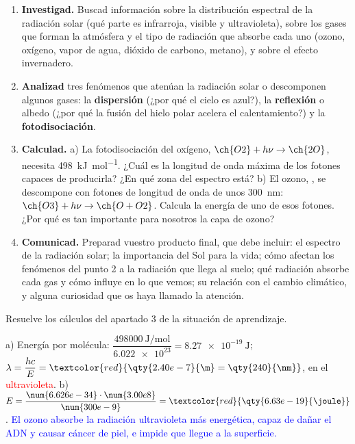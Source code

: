 \begin{enumerate}[label=\numberballred]
    \item \textbf{Investigad.} Buscad información sobre la distribución espectral de la radiación solar (qué parte es infrarroja,
    visible y ultravioleta), sobre los gases que forman la atmósfera y el tipo de radiación que absorbe cada uno (ozono, oxígeno,
    vapor de agua, dióxido de carbono, metano), y sobre el efecto invernadero.
    \item \textbf{Analizad} tres fenómenos que atenúan la radiación solar o descomponen algunos gases: la \textbf{dispersión}
    (¿por qué el cielo es azul?), la \textbf{reflexión} o albedo (¿por qué la fusión del hielo polar acelera el calentamiento?) y
    la \textbf{fotodisociación}.
    \item \textbf{Calculad.} a) La fotodisociación del oxígeno, \(\ch{O2} + h\nu \rightarrow \ch{2 O}\), necesita
    \qty{498}{\kilo\joule\per\mol}. ¿Cuál es la longitud de onda máxima de los fotones capaces de producirla? ¿En qué zona del
    espectro está? b) El ozono, , se descompone con fotones de longitud de onda de unos \qty{300}{\nm}:
    \(\ch{O3} + h\nu \rightarrow \ch{O + O2}\). Calcula la energía de uno de esos fotones. ¿Por qué es tan importante para
    nosotros la capa de ozono?
    \item \textbf{Comunicad.} Preparad vuestro producto final, que debe incluir: el espectro de la radiación solar; la importancia
    del Sol para la vida; cómo afectan los fenómenos del punto 2 a la radiación que llega al suelo; qué radiación absorbe cada gas
    y cómo influye en lo que vemos; su relación con el cambio climático, y alguna curiosidad que os haya llamado la atención.
\end{enumerate}

\begin{exercise}
    Resuelve los cálculos del apartado 3 de la situación de aprendizaje.
    \begin{solu}
        a) Energía por molécula: \(\dfrac{\qty{498000}{\joule\per\mol}}{\num{6.022e23}} = \qty{8.27e-19}{\joule}\);
        \(\lambda = \dfrac{h c}{E} = \textcolor{red}{\qty{2.40e-7}{\m} = \qty{240}{\nm}}\), en el \textcolor{red}{ultravioleta}.
        b) \(E = \dfrac{\num{6.626e-34} \cdot \num{3.00e8}}{\num{300e-9}} = \textcolor{red}{\qty{6.63e-19}{\joule}}\).
        \textcolor{blue}{El ozono absorbe la radiación ultravioleta más energética, capaz de dañar el ADN y causar cáncer de piel,
        e impide que llegue a la superficie.}
    \end{solu}
\end{exercise}
